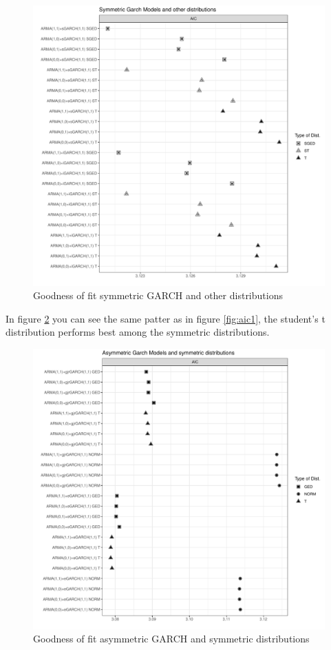 \documentclass[a4paper, twoside]{templates/ociamthesis}
\begin{document}
\begin{figure}[h]

{\centering \includegraphics[width=0.9\linewidth]{figures/aicfigures/symmetric aics2} 

}

\caption{Goodness of fit symmetric GARCH and other distributions}\label{fig:aic2}
\end{figure}
\clearpage
\newpage

\noindent In figure \ref{fig:aic3} you can see the same patter as in figure \ref{fig:aic1}, the student's t distribution performs best among the symmetric distributions.

\begin{figure}[h]

{\centering \includegraphics[width=0.9\linewidth]{figures/aicfigures/asymmetric aics} 

}

\caption{Goodness of fit asymmetric GARCH and symmetric distributions}\label{fig:aic3}
\end{figure}
\newpage
\clearpage
\end{document}
